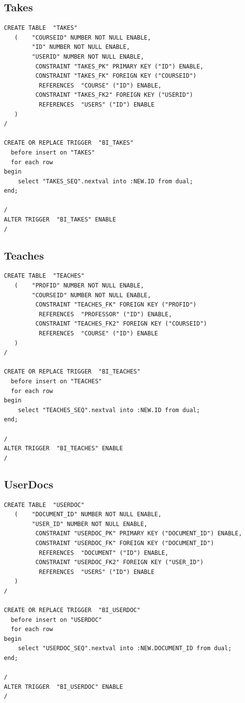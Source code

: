 \documentclass[11pt]{article}
\begin{document}
\subsection{Takes}
\label{sec-4-6}



\begin{verbatim}
CREATE TABLE  "TAKES" 
   (    "COURSEID" NUMBER NOT NULL ENABLE, 
        "ID" NUMBER NOT NULL ENABLE, 
        "USERID" NUMBER NOT NULL ENABLE, 
         CONSTRAINT "TAKES_PK" PRIMARY KEY ("ID") ENABLE, 
         CONSTRAINT "TAKES_FK" FOREIGN KEY ("COURSEID")
          REFERENCES  "COURSE" ("ID") ENABLE, 
         CONSTRAINT "TAKES_FK2" FOREIGN KEY ("USERID")
          REFERENCES  "USERS" ("ID") ENABLE
   )
/

CREATE OR REPLACE TRIGGER  "BI_TAKES" 
  before insert on "TAKES"               
  for each row  
begin   
    select "TAKES_SEQ".nextval into :NEW.ID from dual; 
end; 

/
ALTER TRIGGER  "BI_TAKES" ENABLE
/
\end{verbatim}
\subsection{Teaches}
\label{sec-4-7}



\begin{verbatim}
CREATE TABLE  "TEACHES" 
   (    "PROFID" NUMBER NOT NULL ENABLE, 
        "COURSEID" NUMBER NOT NULL ENABLE, 
         CONSTRAINT "TEACHES_FK" FOREIGN KEY ("PROFID")
          REFERENCES  "PROFESSOR" ("ID") ENABLE, 
         CONSTRAINT "TEACHES_FK2" FOREIGN KEY ("COURSEID")
          REFERENCES  "COURSE" ("ID") ENABLE
   )
/

CREATE OR REPLACE TRIGGER  "BI_TEACHES" 
  before insert on "TEACHES"               
  for each row  
begin   
    select "TEACHES_SEQ".nextval into :NEW.ID from dual; 
end; 

/
ALTER TRIGGER  "BI_TEACHES" ENABLE
/
\end{verbatim}
\subsection{UserDocs}
\label{sec-4-8}



\begin{verbatim}
CREATE TABLE  "USERDOC" 
   (    "DOCUMENT_ID" NUMBER NOT NULL ENABLE, 
        "USER_ID" NUMBER NOT NULL ENABLE, 
         CONSTRAINT "USERDOC_PK" PRIMARY KEY ("DOCUMENT_ID") ENABLE, 
         CONSTRAINT "USERDOC_FK" FOREIGN KEY ("DOCUMENT_ID")
          REFERENCES  "DOCUMENT" ("ID") ENABLE, 
         CONSTRAINT "USERDOC_FK2" FOREIGN KEY ("USER_ID")
          REFERENCES  "USERS" ("ID") ENABLE
   )
/

CREATE OR REPLACE TRIGGER  "BI_USERDOC" 
  before insert on "USERDOC"               
  for each row  
begin   
    select "USERDOC_SEQ".nextval into :NEW.DOCUMENT_ID from dual; 
end; 

/
ALTER TRIGGER  "BI_USERDOC" ENABLE
/
\end{verbatim}
\end{document}
